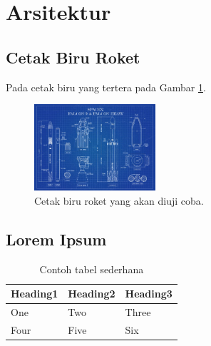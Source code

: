 \section{Arsitektur}
\label{sec:arsitektur}


\subsection{Cetak Biru Roket}
\label{subsec:cetakbiruroket}

Pada cetak biru yang tertera pada Gambar \ref{fig:cetakbiru}. \lipsum[8]

\begin{figure} [ht]
  \centering
  \includegraphics[width=0.4\textwidth]{gambar/cetakbiru.jpg}

  \caption{Cetak biru roket yang akan diuji coba. \cite{cetakbiruspacex}}
  \label{fig:cetakbiru}
\end{figure}

\lipsum[9-10]

\subsection{Lorem Ipsum}
\label{subsec:loremipsum}

\lipsum[11]

\begin{table}
  \caption{Contoh tabel sederhana}
  \label{tab:tabelsederhana}
  \centering
  \begin{tabular}{lll}
    \toprule
    Heading1 & Heading2 & Heading3  \\
    \midrule
    One      & Two      & Three     \\
    Four     & Five     & Six       \\
    \bottomrule
  \end{tabular}
\end{table}

